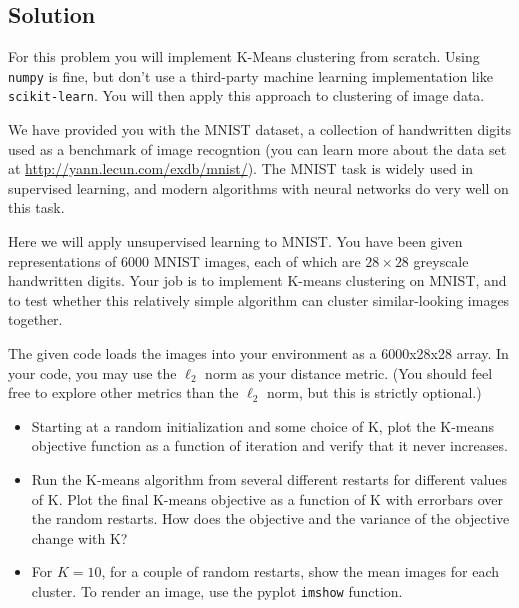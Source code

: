\documentclass[submit]{harvardml}
\begin{document}
\subsection*{Solution}

\newpage

\begin{problem}

For this problem you will implement K-Means clustering from
scratch. Using \texttt{numpy} is fine, but don't use a third-party
machine learning implementation like \texttt{scikit-learn}. You will
then apply this approach to clustering of image data.

We have provided you with the MNIST dataset, a collection of
handwritten digits used as a benchmark of image recogntion (you can
learn more about the data set at
\url{http://yann.lecun.com/exdb/mnist/}). The MNIST task is widely
used in supervised learning, and modern algorithms with neural
networks do very well on this task.

Here we will apply unsupervised learning to MNIST. You have been given
representations of 6000 MNIST images, each of which are $28\times28$
greyscale handwritten digits. Your job is to implement K-means
clustering on MNIST, and to test whether this relatively simple
algorithm can cluster similar-looking images together.

The given code loads the images into your environment as a 6000x28x28
array.  In your code, you may use the $\ell_2$ norm as your distance
metric. (You should feel free to explore other metrics than the
$\ell_2$ norm, but this is strictly optional.)

\begin{itemize}

\item Starting at a random initialization and some choice of K, plot
  the K-means objective function as a function of iteration and verify
  that it never increases.

\item Run the K-means algorithm from several different restarts for
  different values of K.  Plot the final K-means objective as a
  function of K with errorbars over the random restarts.  How does the
  objective and the variance of the objective change with K?  
  
\item For $K=10$, for a couple of random restarts, show the mean
  images for each cluster.  To render an image, use the pyplot
  \texttt{imshow} function.


\end{itemize}
\end{problem}
\end{document}
